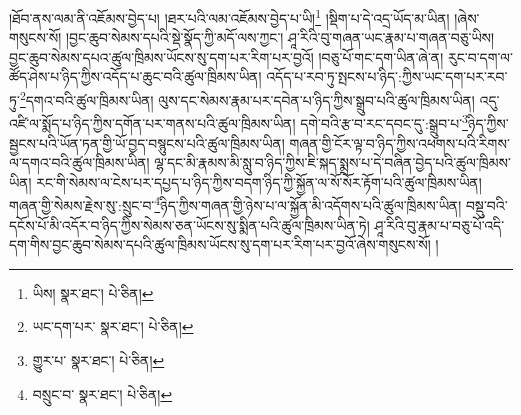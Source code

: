 །ཐོབ་ནས་ལམ་ནི་འཇོམས་བྱེད་པ། །ཐར་པའི་ལམ་འཇོམས་བྱེད་པ་ཡི།\footnote{ཡིས།  སྣར་ཐང་།  པེ་ཅིན། } །སྡིག་པ་དེ་འདྲ་ཡོད་མ་ཡིན། །ཞེས་གསུངས་སོ། །བྱང་ཆུབ་སེམས་དཔའི་སྡེ་སྣོད་ཀྱི་མདོ་ལས་ཀྱང་། ཤཱ་རིའི་བུ་གཞན་ཡང་རྣམ་པ་གཞན་བཅུ་ཡིས། བྱང་ཆུབ་སེམས་དཔའ་ཚུལ་ཁྲིམས་ཡོངས་སུ་དག་པར་རིག་པར་བྱའོ། །བཅུ་པོ་གང་དག་ཡིན་ཞེ་ན། རུང་བ་དག་ལ་ཚོད་ཤེས་པ་ཉིད་ཀྱིས་འདོད་པ་ཆུང་བའི་ཚུལ་ཁྲིམས་ཡིན། འདོད་པ་རབ་ཏུ་སྤངས་པ་ཉིད་:ཀྱིས་ཡང་དག་པར་རབ་ཏུ་\footnote{ཡང་དག་པར་  སྣར་ཐང་།  པེ་ཅིན། }དགའ་བའི་ཚུལ་ཁྲིམས་ཡིན། ལུས་དང་སེམས་རྣམ་པར་དབེན་པ་ཉིད་ཀྱིས་སྒྲུབ་པའི་ཚུལ་ཁྲིམས་ཡིན། འདུ་འཛི་ལ་སྨོད་པ་ཉིད་ཀྱིས་དགོན་པར་གནས་པའི་ཚུལ་ཁྲིམས་ཡིན། དགེ་བའི་རྩ་བ་རང་དབང་དུ་:སྒྲུབ་པ་\footnote{གྱུར་པ་  སྣར་ཐང་།  པེ་ཅིན། }ཉིད་ཀྱིས་སྦྱངས་པའི་ཡོན་ཏན་གྱི་ཡོ་བྱད་བསྙུངས་པའི་ཚུལ་ཁྲིམས་ཡིན། གཞན་གྱི་ངོར་ལྟ་བ་ཉིད་ཀྱིས་འཕགས་པའི་རིགས་ལ་དགའ་བའི་ཚུལ་ཁྲིམས་ཡིན། ལྷ་དང་མི་རྣམས་མི་སླུ་བ་ཉིད་ཀྱིས་ཇི་སྐད་སྨྲས་པ་དེ་བཞིན་བྱེད་པའི་ཚུལ་ཁྲིམས་ཡིན། རང་གི་སེམས་ལ་ངེས་པར་དཔྱད་པ་ཉིད་ཀྱིས་བདག་ཉིད་ཀྱི་སྐྱོན་ལ་སོ་སོར་རྟོག་པའི་ཚུལ་ཁྲིམས་ཡིན། གཞན་གྱི་སེམས་རྗེས་སུ་:སྲུང་བ་\footnote{བསྲུང་བ་  སྣར་ཐང་།  པེ་ཅིན། }ཉིད་ཀྱིས་གཞན་གྱི་ཉེས་པ་ལ་སྐྱོན་མི་འདོགས་པའི་ཚུལ་ཁྲིམས་ཡིན། བསྡུ་བའི་དངོས་པོ་མི་འདོར་བ་ཉིད་ཀྱིས་སེམས་ཅན་ཡོངས་སུ་སྨིན་པའི་ཚུལ་ཁྲིམས་ཡིན་ཏེ། ཤཱ་རིའི་བུ་རྣམ་པ་བཅུ་པོ་འདི་དག་གིས་བྱང་ཆུབ་སེམས་དཔའི་ཚུལ་ཁྲིམས་ཡོངས་སུ་དག་པར་རིག་པར་བྱའོ་ཞེས་གསུངས་སོ། །
